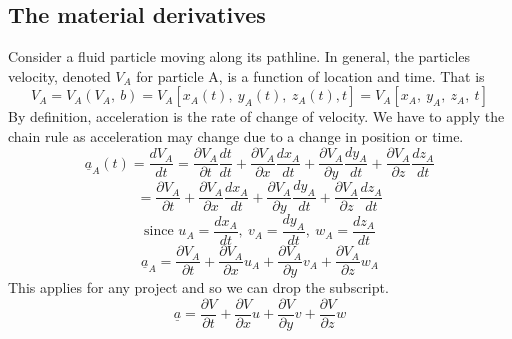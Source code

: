 \documentclass[class=report, crop=false, 12pt,a4paper]{standalone}
\begin{document}
\subsection{The material derivatives}
Consider a fluid particle moving along its pathline. In general, the particles velocity, denoted \(V_A\) for particle A, is a function of location and time. That is
\[ V_A = V_A(V_A, \ b) = V_A \left[ x_A(t), \ y_A(t), \ z_A(t), t \right] = V_A \left[ x_A, \ y_A, \ z_A,\  t \right] 
\]
By definition, acceleration is the rate of change of velocity. We have to apply the chain rule as acceleration may change due to a change in position or time. 
\[ \underline{a}_A(t) = \frac{dV_A}{dt} = \frac{\partial V_A}{\partial t} \frac{dt}{dt} + \frac{\partial V_A}{\partial x} \frac{dx_A}{dt} + \frac{\partial V_A}{\partial y} \frac{dy_A}{dt} + \frac{\partial V_A}{\partial z} \frac{dz_A}{dt} \]
\[ = \frac{\partial V_A}{\partial t} + \frac{\partial V_A}{\partial x} \frac{dx_A}{dt} + \frac{\partial V_A}{\partial y} \frac{dy_A}{dt} + \frac{\partial V_A}{\partial z} \frac{dz_A}{dt} \]
\[ \textrm{since } u_A = \frac{dx_A}{dt}, \ v_A = \frac{dy_A}{dt}, \ w_A = \frac{dz_A}{dt} \]
\[ \underline{a}_A = \frac{\partial V_A}{\partial t} + \frac{\partial V_A}{\partial x} u_A + \frac{\partial V_A}{\partial y} v_A + \frac{\partial V_A}{\partial z} w_A \]
This applies for any project and so we can drop the subscript.
\[ \underline{a} = \frac{\partial V}{\partial t} + \frac{\partial V}{\partial x} u + \frac{\partial V}{\partial y} v + \frac{\partial V}{\partial z} w \]
\end{document}
